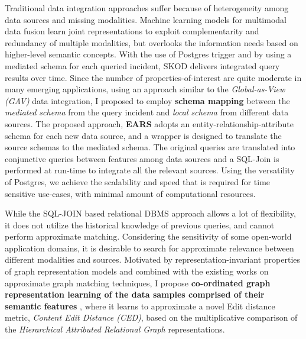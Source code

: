 
Traditional data integration approaches suffer because of heterogeneity among data sources and 
missing %
modalities. Machine learning models for multimodal data fusion learn joint representations to exploit complementarity and redundancy of multiple modalities, but overlooks the information needs based on higher-level semantic concepts. With the use of Postgres trigger and by using a mediated schema for each queried incident, SKOD delivers integrated query results over time. Since the number of properties-of-interest are quite moderate in many emerging applications, using an approach similar to the \textit{Global-as-View (GAV)} data integration, I proposed to employ \textbf{schema mapping} between the \textit{mediated schema} from the query incident and \textit{local schema} from different data sources. The proposed approach, \textbf{EARS} \cite{solaiman2021applying} adopts an entity-relationship-attribute schema for each new data source, and a wrapper is designed to translate the source schemas to the mediated schema. The original queries are translated into conjunctive queries between features among data sources and a SQL-Join is performed at run-time to integrate all the relevant sources. Using the versatility of Postgres, we achieve the scalability and speed that is required for time sensitive use-cases, with minimal amount of computational resources. 

While the SQL-JOIN based relational DBMS approach allows a lot of flexibility, it does not utilize the historical knowledge of previous queries,
and cannot perform approximate matching. Considering the sensitivity of some open-world application domains, it is desirable to search for approximate relevance between different modalities and sources. 
Motivated by
representation-invariant properties of graph representation models and 
combined with the existing works on approximate graph matching techniques, 
I propose \textbf{co-ordinated graph representation learning of the data samples comprised of their semantic features} \cite{solaiman2022femmir}, where it learns to approximate a novel Edit distance metric, \textit{Content Edit Distance (CED)}, based on the multiplicative comparison of the \textit{Hierarchical Attributed Relational Graph} representations. 
